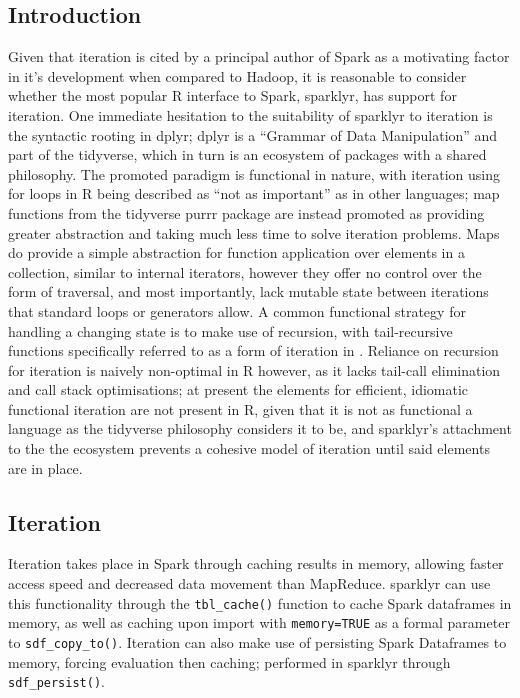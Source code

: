 \documentclass[a4paper,10pt]{article}
\begin{document}
\subsection{Introduction}
Given that iteration is cited by a principal author of Spark as a motivating
factor in it's development when compared to Hadoop, it is reasonable to
consider whether the most popular R interface to Spark, sparklyr, has support
for iteration\cite{zaharia2010spark}\cite{luraschi20}.
One immediate hesitation to the suitability of sparklyr to iteration is the
syntactic rooting in dplyr; dplyr is a ``Grammar of Data Manipulation'' and part
of the tidyverse, which in turn is an ecosystem of packages with a shared
philosophy\cite{wickham2019welcome}\cite{wickham2016r}. 
The promoted paradigm is functional in nature, with iteration using for loops
in R being described as ``not as important'' as in other languages; 
map functions from the tidyverse purrr package are instead promoted as
providing greater abstraction and taking much less time to solve iteration
problems.
Maps do provide a simple abstraction for function application over elements in
a collection, similar to internal iterators, however they offer no control over
the form of traversal, and most importantly, lack mutable state between
iterations that standard loops or generators allow\cite{cousineau1998functional}.
A common functional strategy for handling a changing state is to make use of
recursion, with tail-recursive functions specifically referred to as a form of
iteration in \citeauthor{abelson1996structure}.
Reliance on recursion for iteration is naively non-optimal in R however, as it
lacks tail-call elimination and call stack optimisations\cite{rcore2020lang};
at present the elements for efficient, idiomatic functional iteration are not
present in R, given that it is not as functional a language as the tidyverse
philosophy considers it to be, and sparklyr's attachment to the the ecosystem
prevents a cohesive model of iteration until said elements are in place.

\subsection{Iteration}

Iteration takes place in Spark through caching results in memory, allowing
faster access speed and decreased data movement than
MapReduce\cite{zaharia2010spark}.
sparklyr can use this functionality through the \texttt{tbl\_cache()} function
to cache Spark dataframes in memory, as well as caching upon import with
\texttt{memory=TRUE} as a formal parameter to \texttt{sdf\_copy\_to()}. 
Iteration can also make use of persisting Spark Dataframes to memory, forcing
evaluation then caching; performed in sparklyr through \texttt{sdf\_persist()}.
\end{document}

